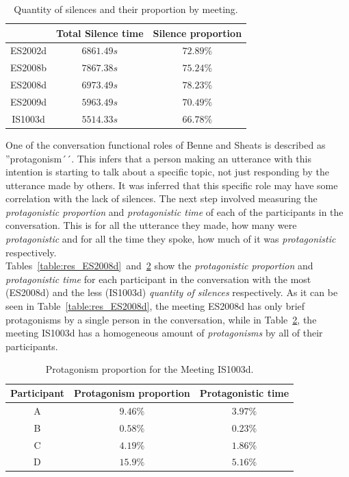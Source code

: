 \begin{table}[H]
    \centering
    \begin{tabular}{ccc}
        \hline    
        & Total Silence time & Silence proportion \\ \hline
        ES2002d & $6861.49s$         & $72.89\%$  \\
        ES2008b & $7867.38s$         & $75.24\%$  \\
        ES2008d & $6973.49s$         & $78.23\%$  \\
        ES2009d & $5963.49s$         & $70.49\%$  \\
        IS1003d & $5514.33s$         & $66.78\%$  \\
        \hline
    \end{tabular}
    \caption{Quantity of silences and their proportion by meeting.}
    \label{table:ami_times}
\end{table}

One of the conversation functional roles of Benne and Sheats is described as ''protagonism´´. This infers that a person making an utterance with this intention is starting to talk about a specific topic, not just responding by the utterance made by others. It was inferred that this specific role may have some correlation with the lack of silences. The next step involved measuring the \textit{protagonistic proportion} and \textit{protagonistic time} of each of the participants in the conversation. This is for all the utterance they made, how many were \textit{protagonistic} and for all the time they spoke, how much of it was \textit{protagonistic} respectively.\\

Tables~\ref{table:res_ES2008d}~and~\ref{table:res_IS1003d} show the \textit{protagonistic proportion} and \textit{protagonistic time} for each participant in the conversation with the most (ES2008d) and the less (IS1003d) \textit{quantity of silences} respectively. As it can be seen in Table~\ref{table:res_ES2008d}, the meeting ES2008d has only brief protagonisms by a single person in the conversation, while in Table~\ref{table:res_IS1003d}, the meeting IS1003d has a homogeneous amount of \textit{protagonisms} by all of their participants.\\

\begin{table}[H]
    \centering
    \begin{tabular}{ccc}
    \hline
    Participant & Protagonism proportion & Protagonistic time \\ \hline
    A           & $9.46\%$                & $3.97\%$            \\
    B           & $0.58\%$                & $0.23\%$            \\
    C           & $4.19\%$                & $1.86\%$            \\
    D           & $15.9\%$                & $5.16\%$
             \\
    \hline
    \end{tabular}
    \caption{Protagonism proportion for the Meeting IS1003d.}
    \label{table:res_IS1003d}
\end{table}

